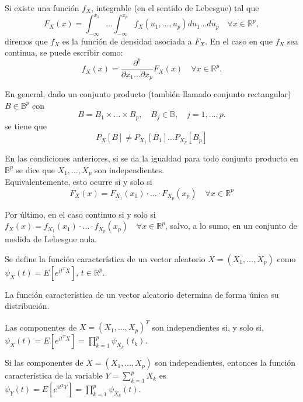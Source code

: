 \begin{ndef}
    Si existe una función $f_X$, integrable (en el sentido de Lebesgue) tal que
    \[
    F_X(x) = \int^{x_1}_{-\infty} \dots \int^{x_p}_{-\infty} f_X(u_1, \dots,  u_p) du_1 \dots du_p \quad \forall x \in \mathbb{R}^p
    ,\]
    diremos que $f_X$ es la función de densidad asociada a  $F_X$. En el caso en que $f_X$ sea continua, se puede escribir como:
    \[
    f_X(x) = \frac{\partial^p}{\partial x_1 \dots \partial x_p} F_X(x) \quad \forall x \in \mathbb{R}^p
    .\]
\end{ndef}

En general, dado un conjunto producto (también llamado conjunto rectangular) $B \in \mathbb{B}^p$ con
\[
    B = B_1 \times \dots \times B_p,\quad B_j \in \mathbb{B}, \quad j = 1, \dots, p
.\]
se tiene que
\[
P_X[B] \neq P_{X_1}[B_1] \dots  P_{X_p}[B_p]
\]

\begin{ndef}
    En las condiciones anteriores, si se da la igualdad para todo conjunto producto en $\mathbb{B}^p$ se dice que $X_1, \dots, X_p$ son independientes. \\

    Equivalentemente, esto ocurre si y solo si
    \[
    F_X (x) = F_{X_1} (x_1)\cdot \dots \cdot F_{X_p}(x_p) \quad \forall x \in \mathbb{R}^p
    \]

    Por último, en el caso continuo si y solo si $f_X (x) = f_{X_1}(x_1) \cdot \dots \cdot f_{X_p}(x_p) \quad \forall x \in \mathbb{R}^p$, salvo, a lo sumo, en un conjunto de medida de Lebesgue nula.
\end{ndef}

\begin{ndef}
  Se define la función característica de un vector aleatorio $X = (X_1,\dots,X_p)$ como $\psi_X(t)=E[e^{it^TX}]$, $t\in \mathbb{R}^p$.
\end{ndef}

\begin{nth}[Unicidad]
  La función característica de un vector aleatorio determina de forma única su distribución.
\end{nth}

\begin{nprop}
  Las componentes de $X=(X_1,\dots,X_p)^T$ son independientes si, y solo si, $\psi_X(t)=E[e^{it^TX}] = \prod_{k=1}^p\psi_{X_k}(t_k)$.
\end{nprop}

\begin{nprop}
  Si las componentes de $X=(X_1,\dots, X_p)$ son independientes, entonces la función característica de la variable $Y=\sum_{k=1}^p X_k$ es $\psi_Y(t)=E[e^{it^TY}] = \prod_{k=1}^p\psi_{X_k}(t)$.
\end{nprop}
